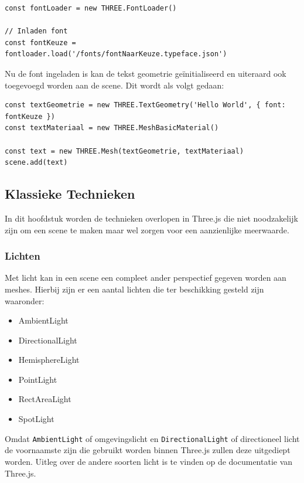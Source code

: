 \begin{lstlisting}
const fontLoader = new THREE.FontLoader()

// Inladen font
const fontKeuze = fontloader.load('/fonts/fontNaarKeuze.typeface.json')
\end{lstlisting}

Nu de font ingeladen is kan de tekst geometrie geïnitialiseerd en uiteraard ook toegevoegd worden aan de scene. Dit wordt als volgt gedaan:

\begin{lstlisting}
const textGeometrie = new THREE.TextGeometry('Hello World', { font: fontKeuze })
const textMateriaal = new THREE.MeshBasicMaterial()

const text = new THREE.Mesh(textGeometrie, textMateriaal)
scene.add(text)
\end{lstlisting}

\newpage
\subsection{Klassieke Technieken}

In dit hoofdstuk worden de technieken overlopen in Three.js die niet noodzakelijk zijn om een scene te maken maar wel zorgen voor een aanzienlijke meerwaarde.

\subsubsection{Lichten}

Met licht kan in een scene een compleet ander perspectief gegeven worden aan meshes. Hierbij zijn er een aantal lichten die ter beschikking gesteld zijn waaronder:

\begin{itemize}
	\item AmbientLight
	\item DirectionalLight
	\item HemisphereLight
	\item PointLight
	\item RectAreaLight
	\item SpotLight
\end{itemize}

Omdat \texttt{AmbientLight} of omgevingslicht en \texttt{DirectionalLight} of directioneel licht de voornaamste zijn die gebruikt worden binnen Three.js zullen deze uitgediept worden. Uitleg over de andere soorten licht is te vinden op de documentatie van Three.js.


